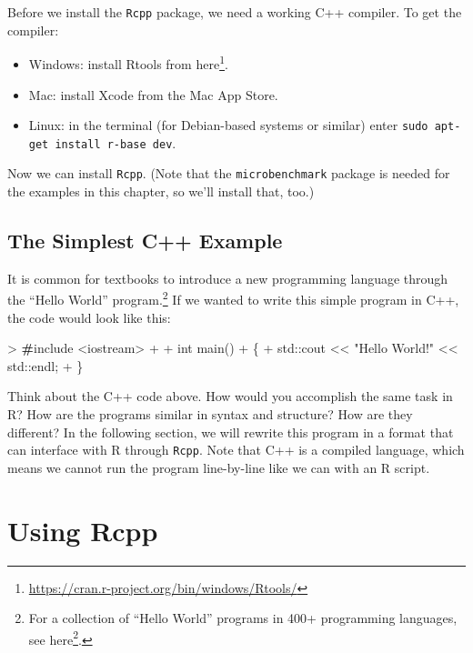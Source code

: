 \documentclass[]{krantz}
\makeatletter
\newenvironment{Shaded}{\begin{snugshade}}{\end{snugshade}}
\newcommand{\BuiltInTok}[1]{#1}
\newcommand{\DataTypeTok}[1]{\textcolor[rgb]{0.27,0.27,0.27}{#1}}
\newcommand{\ErrorTok}[1]{\textcolor[rgb]{0.14,0.14,0.14}{\textbf{#1}}}
\newcommand{\NormalTok}[1]{#1}
\newcommand{\StringTok}[1]{\textcolor[rgb]{0.5,0.5,0.5}{#1}}
\providecommand{\tightlist}{%
  \setlength{\itemsep}{0pt}\setlength{\parskip}{0pt}}
\renewcommand{\href}[2]{#2\footnote{\url{#1}}}
\newenvironment{kframe}{%
\medskip{}
\setlength{\fboxsep}{.8em}
 \def\at@end@of@kframe{}%
 \ifinner\ifhmode%
  \def\at@end@of@kframe{\end{minipage}}%
  \begin{minipage}{\columnwidth}%
 \fi\fi%
 \def\FrameCommand##1{\hskip\@totalleftmargin \hskip-\fboxsep
 \colorbox{shadecolor}{##1}\hskip-\fboxsep
     \hskip-\linewidth \hskip-\@totalleftmargin \hskip\columnwidth}%
 \MakeFramed {\advance\hsize-\width
   \@totalleftmargin\z@ \linewidth\hsize
   \@setminipage}}%
 {\par\unskip\endMakeFramed%
 \at@end@of@kframe}
\renewenvironment{Shaded}{\begin{kframe}}{\end{kframe}}
\makeatother
\begin{document}
Before we install the \texttt{Rcpp} package, we need a working C++ compiler. To get the compiler:

\begin{itemize}
\tightlist
\item
  Windows: install Rtools from \href{https://cran.r-project.org/bin/windows/Rtools/}{here}.
\item
  Mac: install Xcode from the Mac App Store.
\item
  Linux: in the terminal (for Debian-based systems or similar) enter
  \texttt{sudo\ apt-get\ install\ r-base\ dev}.
\end{itemize}

Now we can install \texttt{Rcpp}. (Note that the \texttt{microbenchmark} package is needed for the examples in this chapter, so we'll install that, too.)

\hypertarget{the-simplest-c-example}{%
\subsection{The Simplest C++ Example}\label{the-simplest-c-example}}

It is common for textbooks to introduce a new programming language through the ``Hello World'' program.\footnote{For a collection of ``Hello World'' programs in 400+ programming languages, see \href{https://helloworldcollection.github.io/}{here}.} If we wanted to write this simple program in C++, the code would look like this:

\begin{Shaded}
\begin{Highlighting}[]
\NormalTok{> }\ErrorTok{#}\NormalTok{include <iostream>}
\NormalTok{+ }
\NormalTok{+ }\DataTypeTok{int}\NormalTok{ main()}
\NormalTok{+ \{}
\NormalTok{+     }\BuiltInTok{std::}\NormalTok{cout << }\StringTok{"Hello World!"}\NormalTok{ << }\BuiltInTok{std::}\NormalTok{endl;}
\NormalTok{+ \}}
\end{Highlighting}
\end{Shaded}

Think about the C++ code above. How would you accomplish the same task in R? How are the programs similar in syntax and structure? How are they different? In the following section, we will rewrite this program in a format that can interface with R through \texttt{Rcpp}. Note that C++ is a compiled language, which means we cannot run the program line-by-line like we can with an R script.

\hypertarget{using-rcpp}{%
\section{Using Rcpp}\label{using-rcpp}}
\end{document}
